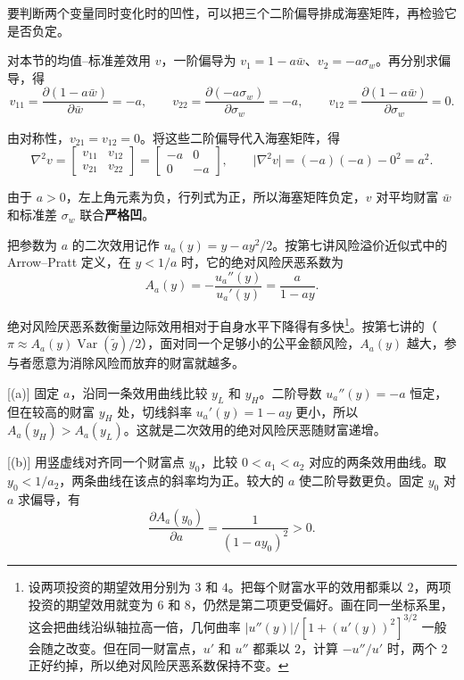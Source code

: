 要判断两个变量同时变化时的凹性，可以把三个二阶偏导排成海塞矩阵，再检验它是否负定。

\begin{solution}[label-content={证明},blank-type=none]
对本节的均值--标准差效用 $v$，一阶偏导为 $v_1=1-a\bar w$、$v_2=-a\sigma_w$。再分别求偏导，得
\[
 v_{11}=\frac{\partial(1-a\bar w)}{\partial\bar w}=-a,\qquad
 v_{22}=\frac{\partial(-a\sigma_w)}{\partial\sigma_w}=-a,\qquad
 v_{12}=\frac{\partial(1-a\bar w)}{\partial\sigma_w}=0.
\]

由对称性，$v_{21}=v_{12}=0$。将这些二阶偏导代入海塞矩阵，得
\[
 \nabla^2v=
 \begin{bmatrix}v_{11}&v_{12}\\v_{21}&v_{22}\end{bmatrix}
 =
 \begin{bmatrix}-a&0\\0&-a\end{bmatrix},
 \qquad \lvert\nabla^2v\rvert=(-a)(-a)-0^2=a^2.
\]

由于 $a>0$，左上角元素为负，行列式为正，所以海塞矩阵负定，$v$ 对平均财富 $\bar w$ 和标准差 $\sigma_w$ 联合\textbf{严格凹}。
\end{solution}

把参数为 $a$ 的二次效用记作 $u_a(y)=y-ay^2/2$。按第七讲风险溢价近似式中的 Arrow--Pratt 定义，在 $y<1/a$ 时，它的绝对风险厌恶系数为
\[
 A_a(y)=-\frac{u_a''(y)}{u_a'(y)}=\frac{a}{1-ay}.
\]

绝对风险厌恶系数衡量边际效用相对于自身水平下降得有多快\footnote{设两项投资的期望效用分别为 $3$ 和 $4$。把每个财富水平的效用都乘以 $2$，两项投资的期望效用就变为 $6$ 和 $8$，仍然是第二项更受偏好。画在同一坐标系里，这会把曲线沿纵轴拉高一倍，几何曲率 $\lvert u''(y)\rvert/[1+(u'(y))^2]^{3/2}$ 一般会随之改变。但在同一财富点，$u'$ 和 $u''$ 都乘以 $2$，计算 $-u''/u'$ 时，两个 $2$ 正好约掉，所以绝对风险厌恶系数保持不变。}。按第七讲的（$\pi\approx A_a(y)\operatorname{Var}(\tilde g)/2$），面对同一个足够小的公平金额风险，$A_a(y)$ 越大，参与者愿意为消除风险而放弃的财富就越多。

[(a)] 固定 $a$，沿同一条效用曲线比较 $y_L$ 和 $y_H$。二阶导数 $u_a''(y)=-a$ 恒定，但在较高的财富 $y_H$ 处，切线斜率 $u_a'(y)=1-ay$ 更小，所以 $A_a(y_H)>A_a(y_L)$。这就是二次效用的绝对风险厌恶随财富递增。

[(b)] 用竖虚线对齐同一个财富点 $y_0$，比较 $0<a_1<a_2$ 对应的两条效用曲线。取 $y_0<1/a_2$，两条曲线在该点的斜率均为正。较大的 $a$ 使二阶导数更负。固定 $y_0$ 对 $a$ 求偏导，有
\[
 \frac{\partial A_a(y_0)}{\partial a}=\frac{1}{(1-ay_0)^2}>0.
\]

